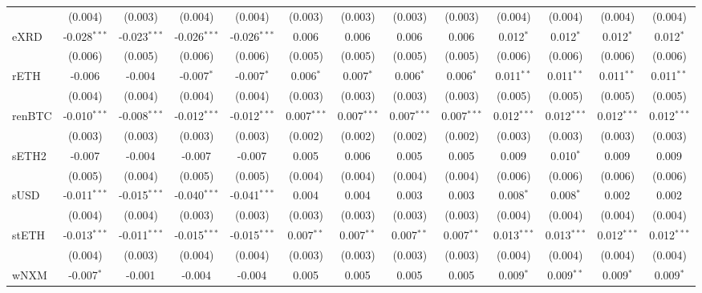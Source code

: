 \begin{table}[!htbp]
\begin{tabular}{@{\extracolsep{5pt}}lcccccccccccc}
  & (0.004) & (0.003) & (0.004) & (0.004) & (0.003) & (0.003) & (0.003) & (0.003) & (0.004) & (0.004) & (0.004) & (0.004) \\
 eXRD & -0.028$^{***}$ & -0.023$^{***}$ & -0.026$^{***}$ & -0.026$^{***}$ & 0.006$^{}$ & 0.006$^{}$ & 0.006$^{}$ & 0.006$^{}$ & 0.012$^{*}$ & 0.012$^{*}$ & 0.012$^{*}$ & 0.012$^{*}$ \\
  & (0.006) & (0.005) & (0.006) & (0.006) & (0.005) & (0.005) & (0.005) & (0.005) & (0.006) & (0.006) & (0.006) & (0.006) \\
 rETH & -0.006$^{}$ & -0.004$^{}$ & -0.007$^{*}$ & -0.007$^{*}$ & 0.006$^{*}$ & 0.007$^{*}$ & 0.006$^{*}$ & 0.006$^{*}$ & 0.011$^{**}$ & 0.011$^{**}$ & 0.011$^{**}$ & 0.011$^{**}$ \\
  & (0.004) & (0.004) & (0.004) & (0.004) & (0.003) & (0.003) & (0.003) & (0.003) & (0.005) & (0.005) & (0.005) & (0.005) \\
 renBTC & -0.010$^{***}$ & -0.008$^{***}$ & -0.012$^{***}$ & -0.012$^{***}$ & 0.007$^{***}$ & 0.007$^{***}$ & 0.007$^{***}$ & 0.007$^{***}$ & 0.012$^{***}$ & 0.012$^{***}$ & 0.012$^{***}$ & 0.012$^{***}$ \\
  & (0.003) & (0.003) & (0.003) & (0.003) & (0.002) & (0.002) & (0.002) & (0.002) & (0.003) & (0.003) & (0.003) & (0.003) \\
 sETH2 & -0.007$^{}$ & -0.004$^{}$ & -0.007$^{}$ & -0.007$^{}$ & 0.005$^{}$ & 0.006$^{}$ & 0.005$^{}$ & 0.005$^{}$ & 0.009$^{}$ & 0.010$^{*}$ & 0.009$^{}$ & 0.009$^{}$ \\
  & (0.005) & (0.004) & (0.005) & (0.005) & (0.004) & (0.004) & (0.004) & (0.004) & (0.006) & (0.006) & (0.006) & (0.006) \\
 sUSD & -0.011$^{***}$ & -0.015$^{***}$ & -0.040$^{***}$ & -0.041$^{***}$ & 0.004$^{}$ & 0.004$^{}$ & 0.003$^{}$ & 0.003$^{}$ & 0.008$^{*}$ & 0.008$^{*}$ & 0.002$^{}$ & 0.002$^{}$ \\
  & (0.004) & (0.004) & (0.003) & (0.003) & (0.003) & (0.003) & (0.003) & (0.003) & (0.004) & (0.004) & (0.004) & (0.004) \\
 stETH & -0.013$^{***}$ & -0.011$^{***}$ & -0.015$^{***}$ & -0.015$^{***}$ & 0.007$^{**}$ & 0.007$^{**}$ & 0.007$^{**}$ & 0.007$^{**}$ & 0.013$^{***}$ & 0.013$^{***}$ & 0.012$^{***}$ & 0.012$^{***}$ \\
  & (0.004) & (0.003) & (0.004) & (0.004) & (0.003) & (0.003) & (0.003) & (0.003) & (0.004) & (0.004) & (0.004) & (0.004) \\
 wNXM & -0.007$^{*}$ & -0.001$^{}$ & -0.004$^{}$ & -0.004$^{}$ & 0.005$^{}$ & 0.005$^{}$ & 0.005$^{}$ & 0.005$^{}$ & 0.009$^{*}$ & 0.009$^{**}$ & 0.009$^{*}$ & 0.009$^{*}$ \\

\end{tabular}
\end{table}
